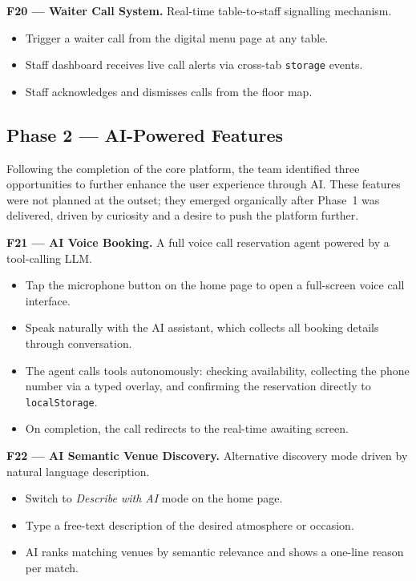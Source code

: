 \documentclass[12pt,a4paper,oneside]{report}
\begin{document}
\textbf{F20 --- Waiter Call System.}
Real-time table-to-staff signalling mechanism.
\begin{itemize}[leftmargin=1.5em, topsep=2pt, itemsep=1pt]
  \item Trigger a waiter call from the digital menu page at any table.
  \item Staff dashboard receives live call alerts via cross-tab
        \texttt{storage} events.
  \item Staff acknowledges and dismisses calls from the floor map.
\end{itemize}

\subsection{Phase 2 --- AI-Powered Features}

Following the completion of the core platform, the team identified three
opportunities to further enhance the user experience through AI. These features
were not planned at the outset; they emerged organically after Phase~1 was
delivered, driven by curiosity and a desire to push the platform further.

\textbf{F21 --- AI Voice Booking.}
A full voice call reservation agent powered by a tool-calling LLM.
\begin{itemize}[leftmargin=1.5em, topsep=2pt, itemsep=1pt]
  \item Tap the microphone button on the home page to open a full-screen
        voice call interface.
  \item Speak naturally with the AI assistant, which collects all booking
        details through conversation.
  \item The agent calls tools autonomously: checking availability, collecting
        the phone number via a typed overlay, and confirming the reservation
        directly to \texttt{localStorage}.
  \item On completion, the call redirects to the real-time awaiting screen.
\end{itemize}

\textbf{F22 --- AI Semantic Venue Discovery.}
Alternative discovery mode driven by natural language description.
\begin{itemize}[leftmargin=1.5em, topsep=2pt, itemsep=1pt]
  \item Switch to \emph{Describe with AI} mode on the home page.
  \item Type a free-text description of the desired atmosphere or occasion.
  \item AI ranks matching venues by semantic relevance and shows a one-line
        reason per match.
\end{itemize}
\end{document}
